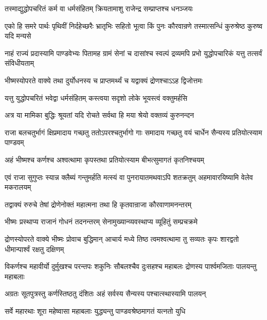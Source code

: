 \twolineshloka
{तस्माद्युद्धोपचरितं कर्म वा धर्मसंहितम्}
{क्रियतामाशु राजेन्द्र सम्प्राप्तश्च धनञ्जयः}


\threelineshloka
{एको हि समरे पार्थः पृथिवीं निर्दहेच्छरैः}
{भ्रातृभिः सहितो भूत्वा किं पुनः कौरवान्रणे}
{तस्मात्सन्धिं कुरुश्रेष्ठ कुरुष्व यदि मन्यसे}




\threelineshloka
{नाहं राज्यं प्रदास्यामि पाण्डवेभ्यः पितामह}
{ग्रामं सेनां च दासांश्च स्वल्पं द्रव्यमपि प्रभो}
{युद्धोपचारिकं यत्तु तत्सर्वं संविधीयताम्}



\twolineshloka
{भीष्मस्योपरते वाक्ये तथा दुर्योधनस्य च}
{प्राप्तमर्थ्यं च यद्वाक्यं द्रोणश्चाऽऽह द्विजोत्तमः}


\twolineshloka
{यत्तु युद्धोपचरितं भवेद्वा धर्मसंहितम्}
{कस्त्वया सदृशो लोके भूयस्त्वं वक्तुमर्हसि}


\twolineshloka
{अत्र या मामिका बुद्धिः श्रूयतां यदि रोचते}
{सर्वथा हि मया श्रेयो वक्तव्यं कुरुनन्दन}


\threelineshloka
{राजा बलचतुर्भागं क्षिप्रमादाय गच्छतु}
{ततोऽपरश्चतुर्भागो गाः समादाय गच्छतु}
{वयं चार्धेन सैन्यस्य प्रतियोत्स्याम पाण्डवम्}


\twolineshloka
{अहं भीष्मश्च कर्णश्च अश्वत्थामा कृपस्तथा}
{प्रतियोत्स्याम बीभत्सुमागतं कृतनिश्चयम्}


\threelineshloka
{एवं राजा सुगुप्तः स्यान्न क्लैब्यं गन्तुमर्हति}
{मत्स्यं वा पुनरायातमथवाऽपि शतक्रतुम्}
{अहमावारयिष्यामि वेलेव मकरालयम्}



\twolineshloka
{तद्वाक्यं रुरुचे तेषां द्रोणेनोक्तं महात्मना}
{तथा हि कृतवान्राजा कौरवाणामनन्तरम्}


\twolineshloka
{भीष्मः प्रस्थाप्य राजानं गोधनं तदनन्तरम्}
{सेनामुख्यान्व्यवस्थाप्य व्यूहितुं सम्प्रचक्रमे}


\threelineshloka
{द्रोणस्योपरते वाक्ये भीष्मः प्रोवाच बुद्धिमान्}
{आचार्य मध्ये तिष्ठ त्वमश्वत्थामा तु सव्यतः}
{कृपः शारद्वतो धीमान्पार्श्वं रक्षतु दक्षिणम्}


\threelineshloka
{विकर्णश्च महावीर्यो दुर्मुखश्च परन्तपः}
{शकुनिः सौबलश्चैव दुःसहश्च महाबलः}
{द्रोणस्य पार्श्वमजिताः पालयन्तु महाबलाः}


\twolineshloka
{अग्रतः सूतपुत्रस्तु कर्णस्तिष्ठतु दंशितः}
{अहं सर्वस्य सैन्यस्य पश्चात्स्थास्यामि पालयन्}


\twolineshloka
{सर्वे महारथाः शूरा महेष्वासा महाबलाः}
{युद्ध्यन्तु पाण्डवश्रेष्ठमागतं यत्नतो युधि}


